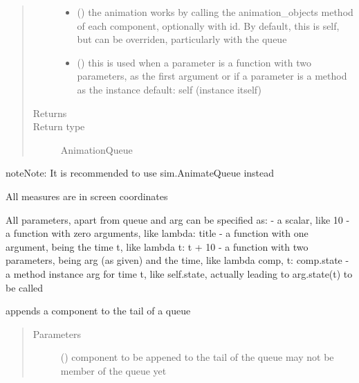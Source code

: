 \documentclass[letterpaper,10pt,english]{sphinxmanual}
\begin{document}
\begin{fulllineitems}
\begin{fulllineitems}
\begin{quote}
\begin{description}
\begin{itemize}
\item {} 
 () \textendash{} the animation works by calling the animation\_objects method of each component, optionally
with id. By default, this is self, but can be overriden, particularly with the queue

\item {} 
 () \textendash{} this is used when a parameter is a function with two parameters, as the first argument or
if a parameter is a method as the instance 
default: self (instance itself)

\end{itemize}

\item[{Returns}] \leavevmode
{}

\item[{Return type}] \leavevmode
AnimationQueue

\end{description}\end{quote}

\begin{sphinxadmonition}{note}{Note:}
It is recommended to use sim.AnimateQueue instead 

All measures are in screen coordinates 

All parameters, apart from queue and arg can be specified as: 
- a scalar, like 10 
- a function with zero arguments, like lambda: title 
- a function with one argument, being the time t, like lambda t: t + 10 
- a function with two parameters, being arg (as given) and the time, like lambda comp, t: comp.state 
- a method instance arg for time t, like self.state, actually leading to arg.state(t) to be called
\end{sphinxadmonition}

\end{fulllineitems}


\begin{fulllineitems}
\label{\detokenize{Reference:salabim.Queue.append}}
appends a component to the tail of a queue
\begin{quote}\begin{description}
\item[{Parameters}] \leavevmode
{} ({\hyperref[\detokenize{Reference:salabim.Component}]{}}) \textendash{} component to be appened to the tail of the queue 
may not be member of the queue yet


\end{description}
\end{quote}
\end{fulllineitems}
\end{fulllineitems}
\end{document}
